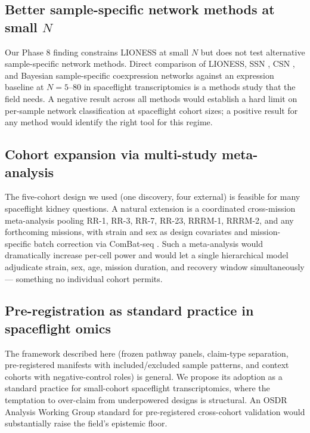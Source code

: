 \documentclass[11pt]{article}
\begin{document}
\subsection{Better sample-specific network methods at small $N$}

Our Phase 8 finding constrains LIONESS at small $N$ but does not test alternative sample-specific network methods. Direct comparison of LIONESS, SSN \citep{liu2016single}, CSN \citep{dai2019cell}, and Bayesian sample-specific coexpression networks against an expression baseline at $N=5$--$80$ in spaceflight transcriptomics is a methods study that the field needs. A negative result across all methods would establish a hard limit on per-sample network classification at spaceflight cohort sizes; a positive result for any method would identify the right tool for this regime.

\subsection{Cohort expansion via multi-study meta-analysis}

The five-cohort design we used (one discovery, four external) is feasible for many spaceflight kidney questions. A natural extension is a coordinated cross-mission meta-analysis pooling RR-1, RR-3, RR-7, RR-23, RRRM-1, RRRM-2, and any forthcoming missions, with strain and sex as design covariates and mission-specific batch correction via ComBat-seq \citep{zhang2020combat}. Such a meta-analysis would dramatically increase per-cell power and would let a single hierarchical model adjudicate strain, sex, age, mission duration, and recovery window simultaneously --- something no individual cohort permits.

\subsection{Pre-registration as standard practice in spaceflight omics}

The framework described here (frozen pathway panels, claim-type separation, pre-registered manifests with included/excluded sample patterns, and context cohorts with negative-control roles) is general. We propose its adoption as a standard practice for small-cohort spaceflight transcriptomics, where the temptation to over-claim from underpowered designs is structural. An OSDR Analysis Working Group standard for pre-registered cross-cohort validation would substantially raise the field's epistemic floor.
\end{document}
